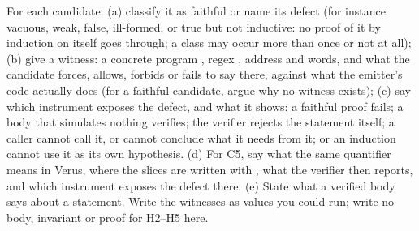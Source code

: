 \documentclass[11pt]{article}
\begin{document}
\begin{problem}
For each candidate: (a) classify it as faithful or name its defect (for
instance vacuous, weak, false, ill-formed, or true but not inductive: no
proof of it by induction on itself goes through; a class may occur more than
once or not at all); (b) give a witness: a concrete program , regex
, address  and words, and what the candidate forces, allows,
forbids or fails to say there, against what the emitter's code actually does
(for a faithful candidate, argue why no witness exists); (c) say which
instrument exposes the defect, and what it shows: a faithful proof fails; a
body that simulates nothing verifies; the verifier rejects the statement
itself; a caller cannot call it, or cannot conclude what it needs from it; or
an induction cannot use it as its own hypothesis. (d) For C5, say what the
same quantifier means in Verus, where the slices are written with
, what the verifier then reports, and which instrument exposes
the defect there. (e) State what a verified body says about a statement.
Write the witnesses as values you could run; write no body, invariant or proof
for H2--H5 here.
\end{problem}
\end{document}
